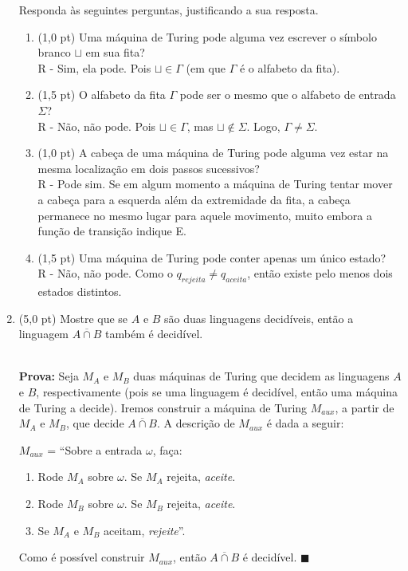 \documentclass[12pt,a4paper,oneside]{article}
\begin{document}
\begin{enumerate}
	 Responda às seguintes perguntas, justificando a sua resposta.
	\begin{enumerate}
		\item (1,0 pt) Uma máquina de Turing pode alguma vez escrever o símbolo branco $\sqcup$ em sua fita? \\
			{\color{verde}
				R - Sim, ela pode. Pois $\sqcup \in \Gamma$ (em que $\Gamma$ é o alfabeto da fita).
			}
		\item (1,5 pt) O alfabeto da fita $\Gamma$ pode ser o mesmo que o alfabeto de entrada $\Sigma$? \\
			{\color{verde}
				R - Não, não pode. Pois $\sqcup \in \Gamma$, mas $\sqcup \not\in \Sigma$. Logo, $\Gamma \not= \Sigma$.
			}
		\item (1,0 pt) A cabeça de uma máquina de Turing pode alguma vez estar na mesma localização em dois passos sucessivos?\\
			{\color{verde}
				R - Pode sim. Se em algum momento a máquina de Turing tentar mover a cabeça para a esquerda além da extremidade da fita, a cabeça permanece no mesmo lugar para aquele movimento, muito embora a função de transição indique E. 
			}
		\item (1,5 pt) Uma máquina de Turing pode conter apenas um único estado?\\
			{\color{verde}
				R - Não, não pode. Como o $q_{rejeita} \not= q_{aceita}$, então existe pelo menos dois estados distintos.
			}
	\end{enumerate}
	
	\item (5,0 pt) Mostre que se $A$ e $B$ são duas linguagens decidíveis, então a linguagem $\overline{A \cap B}$ também é decidível.\\
			\\{\color{verde}	
				{\bf Prova:} Seja $M_A$ e $M_B$ duas máquinas de Turing que decidem as linguagens $A$ e $B$, respectivamente (pois se uma linguagem é decidível, então uma máquina de Turing a decide). Iremos construir a máquina de Turing $M_{aux}$, a partir de $M_A$ e $M_B$, que decide $\overline{A \cap B}$. A descrição de $M_{aux}$ é dada a seguir:
			
			$M_{aux}$ = ``Sobre a entrada $\omega$, faça:
			\begin{enumerate}
				\item Rode $M_A$ sobre $\omega$. Se $M_A$ rejeita, {\it aceite}.
				\item Rode $M_B$ sobre $\omega$. Se $M_B$ rejeita, {\it aceite}.
				\item Se $M_A$ e $M_B$ aceitam, {\it rejeite}''.
			\end{enumerate}
			
			Como é possível construir $M_{aux}$, então $\overline{A \cap B}$ é decidível. $\blacksquare$
			}

\end{enumerate}
\end{document}
